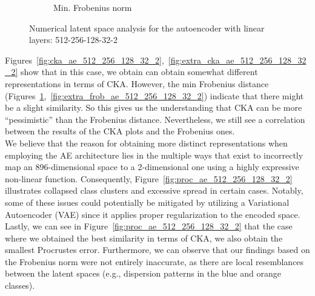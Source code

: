 \documentclass[../main.tex]{subfiles}
\begin{document}
\begin{figure}[ht!]
\begin{subfigure}[b]{0.45\textwidth}
        \caption{Min. Frobenius norm}
         \label{fig:frob_ae_512_256_128_32_2}
     \end{subfigure}
    \caption{Numerical latent space analysis for the autoencoder with linear layers: 512-256-128-32-2}
    \label{fig:lat_num_ae_512_256_128_32_2}
\end{figure}

Figures~\ref{fig:cka_ae_512_256_128_32_2},~\ref{fig:extra_cka_ae_512_256_128_32_2} show that in this case, we obtain can obtain somewhat different representations in terms of CKA. However, the min Frobenius distance (Figures~\ref{fig:frob_ae_512_256_128_32_2},~\ref{fig:extra_frob_ae_512_256_128_32_2}) indicate that there might be a slight similarity. So this gives us the understanding that CKA can be more ``pessimistic'' than the Frobenius distance. Nevertheless, we still see a correlation between the results of the CKA plots and the Frobenius ones.\\

We believe that the reason for obtaining more distinct representations when employing the AE architecture lies in the multiple ways that exist to incorrectly map an 896-dimensional space to a 2-dimensional one using a highly expressive non-linear function. Consequently, Figure~\ref{fig:proc_ae_512_256_128_32_2} illustrates collapsed class clusters and excessive spread in certain cases. Notably, some of these issues could potentially be mitigated by utilizing a Variational Autoencoder (VAE) since it applies proper regularization to the encoded space.\\

Lastly, we can see in Figure~\ref{fig:proc_ae_512_256_128_32_2} that the case where we obtained the best similarity in terms of CKA, we also obtain the smallest Procrustes error. Furthermore, we can observe that our findings based on the Frobenius norm were not entirely inaccurate, as there are local resemblances between the latent spaces (e.g., dispersion patterns in the blue and orange classes).
\end{document}
